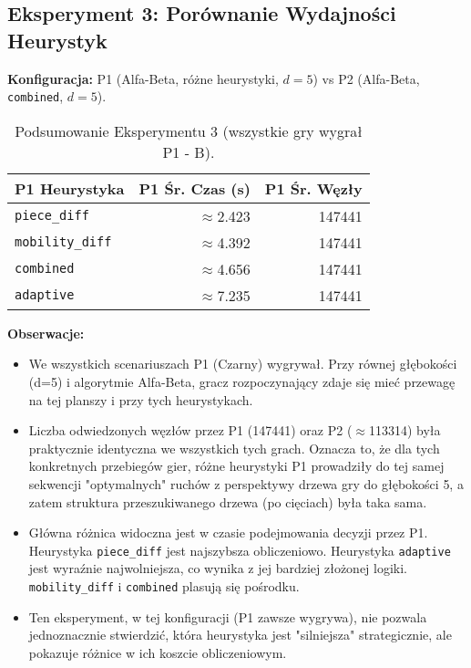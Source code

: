 \documentclass[12pt,a4paper]{article}
\newcommand{\code}[1]{\texttt{#1}} %
\begin{document}
\subsection{Eksperyment 3: Porównanie Wydajności Heurystyk}
\textbf{Konfiguracja:} P1 (Alfa-Beta, różne heurystyki, $d=5$) vs P2 (Alfa-Beta, \code{combined}, $d=5$).
\begin{table}[H]
    \centering
    \caption{Podsumowanie Eksperymentu 3 (wszystkie gry wygrał P1 - B).}
    \begin{tabular}{lrr}
        \toprule
        P1 Heurystyka & P1 Śr. Czas (s) & P1 Śr. Węzły \\ %
        \midrule
        \code{piece\_diff}   & $\approx$2.423 & 147441 \\
        \code{mobility\_diff}& $\approx$4.392 & 147441 \\
        \code{combined}      & $\approx$4.656 & 147441 \\
        \code{adaptive}      & $\approx$7.235 & 147441 \\
        \bottomrule
    \end{tabular}
    \label{tab:e3_summary}
\end{table}
\textbf{Obserwacje:}
\begin{itemize}
    \item We wszystkich scenariuszach P1 (Czarny) wygrywał. Przy równej głębokości (d=5) i algorytmie Alfa-Beta, gracz rozpoczynający zdaje się mieć przewagę na tej planszy i przy tych heurystykach.
    \item Liczba odwiedzonych węzłów przez P1 (147441) oraz P2 ($\approx$113314) była praktycznie identyczna we wszystkich tych grach. Oznacza to, że dla tych konkretnych przebiegów gier, różne heurystyki P1 prowadziły do tej samej sekwencji "optymalnych" ruchów z perspektywy drzewa gry do głębokości 5, a zatem struktura przeszukiwanego drzewa (po cięciach) była taka sama.
    \item Główna różnica widoczna jest w czasie podejmowania decyzji przez P1. Heurystyka \code{piece\_diff} jest najszybsza obliczeniowo. Heurystyka \code{adaptive} jest wyraźnie najwolniejsza, co wynika z jej bardziej złożonej logiki. \code{mobility\_diff} i \code{combined} plasują się pośrodku.
    \item Ten eksperyment, w tej konfiguracji (P1 zawsze wygrywa), nie pozwala jednoznacznie stwierdzić, która heurystyka jest "silniejsza" strategicznie, ale pokazuje różnice w ich koszcie obliczeniowym.
\end{itemize}
\end{document}
